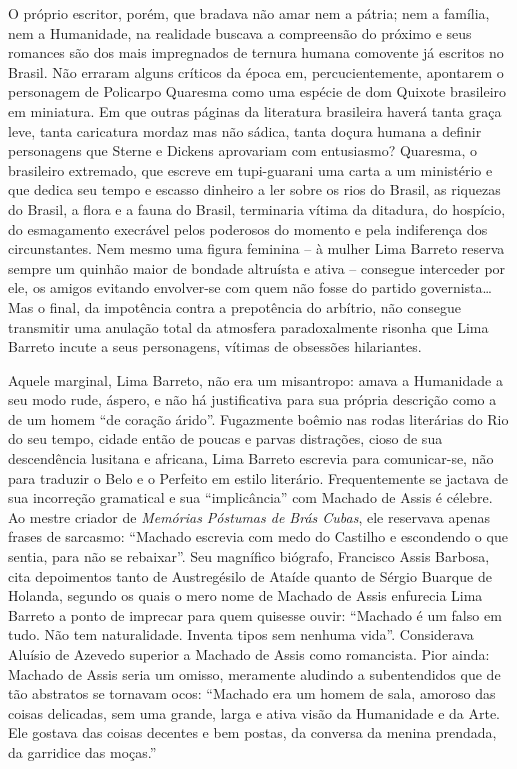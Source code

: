 \documentclass[
  letterpaper,
  DIV=11,
  numbers=noendperiod]{scrreprt}
\begin{document}
O próprio escritor, porém, que bradava não amar nem a pátria; nem a
família, nem a Humanidade, na realidade buscava a compreensão do próximo
e seus romances são dos mais impregnados de ternura humana comovente já
escritos no Brasil. Não erraram alguns críticos da época em,
percucientemente, apontarem o personagem de Policarpo Quaresma como uma
espécie de dom Quixote brasileiro em miniatura. Em que outras páginas da
literatura brasileira haverá tanta graça leve, tanta caricatura mordaz
mas não sádica, tanta doçura humana a definir personagens que Sterne e
Dickens aprovariam com entusiasmo? Quaresma, o brasileiro extremado, que
escreve em tupi-guarani uma carta a um ministério e que dedica seu tempo
e escasso dinheiro a ler sobre os rios do Brasil, as riquezas do Brasil,
a flora e a fauna do Brasil, terminaria vítima da ditadura, do hospício,
do esmagamento execrável pelos poderosos do momento e pela indiferença
dos circunstantes. Nem mesmo uma figura feminina -- à mulher Lima
Barreto reserva sempre um quinhão maior de bondade altruísta e ativa --
consegue interceder por ele, os amigos evitando envolver-se com quem não
fosse do partido governista\ldots{} Mas o final, da impotência contra a
prepotência do arbítrio, não consegue transmitir uma anulação total da
atmosfera paradoxalmente risonha que Lima Barreto incute a seus
personagens, vítimas de obsessões hilariantes.

Aquele marginal, Lima Barreto, não era um misantropo: amava a Humanidade
a seu modo rude, áspero, e não há justificativa para sua própria
descrição como a de um homem ``de coração árido''. Fugazmente boêmio nas
rodas literárias do Rio do seu tempo, cidade então de poucas e parvas
distrações, cioso de sua descendência lusitana e africana, Lima Barreto
escrevia para comunicar-se, não para traduzir o Belo e o Perfeito em
estilo literário. Frequentemente se jactava de sua incorreção gramatical
e sua ``implicância'' com Machado de Assis é célebre. Ao mestre criador
de \emph{Memórias Póstumas de Brás Cubas}, ele reservava apenas frases
de sarcasmo: ``Machado escrevia com medo do Castilho e escondendo o que
sentia, para não se rebaixar''. Seu magnífico biógrafo, Francisco Assis
Barbosa, cita depoimentos tanto de Austregésilo de Ataíde quanto de
Sérgio Buarque de Holanda, segundo os quais o mero nome de Machado de
Assis enfurecia Lima Barreto a ponto de imprecar para quem quisesse
ouvir: ``Machado é um falso em tudo. Não tem naturalidade. Inventa tipos
sem nenhuma vida''. Considerava Aluísio de Azevedo superior a Machado de
Assis como romancista. Pior ainda: Machado de Assis seria um omisso,
meramente aludindo a subentendidos que de tão abstratos se tornavam
ocos: ``Machado era um homem de sala, amoroso das coisas delicadas, sem
uma grande, larga e ativa visão da Humanidade e da Arte. Ele gostava das
coisas decentes e bem postas, da conversa da menina prendada, da
garridice das moças.''
\end{document}
